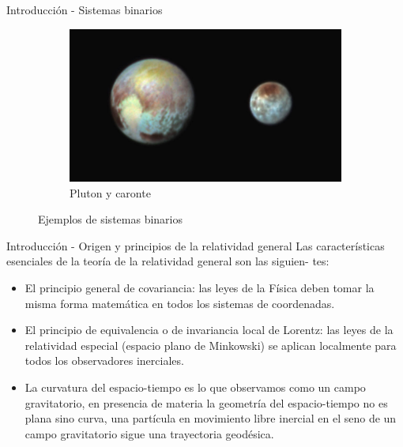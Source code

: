 \begin{frame}{Introducción - Sistemas binarios}
\begin{minipage}{0.20\linewidth}
\begin{figure}[H]
            \begin{subfigure}{1\linewidth}
                \centering
                \includegraphics[scale=0.07]{images/caronte.jpg}
                \caption{Pluton y caronte}
            \end{subfigure}
            \caption{Ejemplos de sistemas binarios}
        \end{figure}
    \end{minipage}
    \end{frame}
\begin{frame}{Introducción - Origen y principios de la relatividad general}
    Las características esenciales de la teoría de la relatividad general son las siguien-
tes:
\begin{itemize}
\item El principio general de covariancia: las leyes de la Física deben tomar la
misma forma matemática en todos los sistemas de coordenadas.
\item El principio de equivalencia o de invariancia local de Lorentz: las leyes de
la relatividad especial (espacio plano de Minkowski) se aplican localmente
para todos los observadores inerciales.
\item La curvatura del espacio-tiempo es lo que observamos como un campo gravitatorio,
 en presencia de materia la geometría del espacio-tiempo no es plana
  sino curva, una partícula en movimiento libre inercial en el seno de un
campo gravitatorio sigue una trayectoria geodésica.
\end{itemize}
\end{frame}